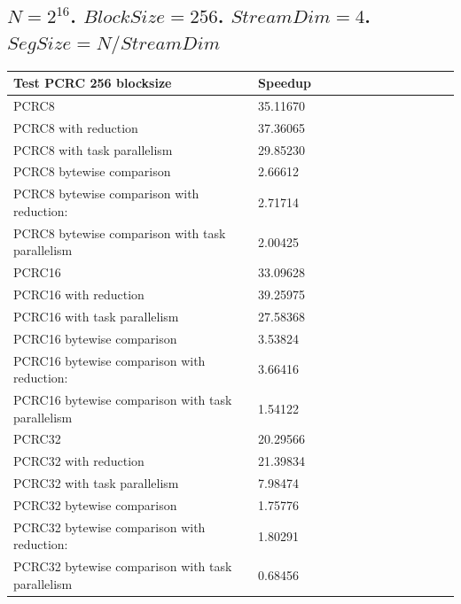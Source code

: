 \documentclass[fleqn]{IEEEtran}
\begin{document}
\subsection{$N=2^{16}$. $BlockSize=256$. $StreamDim=4$. $SegSize=N/StreamDim$}
\begin{footnotesize}
\begin{tabular}{l|l|l|l|l|r|r|r|r|r|r||c|c|}
\toprule
\textbf{Test PCRC 256 blocksize} & \textbf{Speedup} \\
\midrule
PCRC8                                           &	35.11670 \\
PCRC8 with reduction                            &	37.36065 \\
PCRC8 with task parallelism                     &	29.85230 \\
PCRC8 bytewise comparison                       &	2.66612  \\
PCRC8 bytewise comparison with reduction:       &	2.71714  \\
PCRC8 bytewise comparison with task parallelism &	2.00425  \\
PCRC16                                           &	33.09628 \\
PCRC16 with reduction                            &	39.25975 \\
PCRC16 with task parallelism                     &	27.58368 \\
PCRC16 bytewise comparison                       &	3.53824  \\
PCRC16 bytewise comparison with reduction:       &	3.66416  \\
PCRC16 bytewise comparison with task parallelism &	1.54122  \\
PCRC32                                           &	20.29566 \\
PCRC32 with reduction                            &	21.39834 \\
PCRC32 with task parallelism                     &	7.98474  \\
PCRC32 bytewise comparison                       &	1.75776  \\
PCRC32 bytewise comparison with reduction:       &	1.80291  \\
PCRC32 bytewise comparison with task parallelism &	0.68456  \\
\bottomrule
\end{tabular}
\end{footnotesize}
\end{document}
